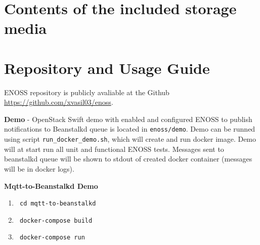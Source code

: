 
\chapter{Contents of the included storage media}

\chapter{Repository and Usage Guide}
ENOSS repository is publicly avaliable at the Github {\url{https://github.com/xvasil03/enoss}}.

\textbf{Demo} - OpenStack Swift demo with enabled and configured ENOSS to publish notifications to Beanstalkd queue is located in \texttt{enoss/demo}. Demo can be runned using script \texttt{run\_docker\_demo.sh}, which will create and run docker image. Demo will at start run all unit and functional ENOSS tests. Messages sent to beanstalkd queue will be shown to stdout of created docker container (messages will be in docker logs).

\textbf{Mqtt-to-Beanstalkd Demo}
\begin{enumerate}
    \item \begin{verbatim} cd mqtt-to-beanstalkd\end{verbatim}
    \item \begin{verbatim} docker-compose build\end{verbatim}
    \item \begin{verbatim} docker-compose run\end{verbatim}
\end{enumerate}

